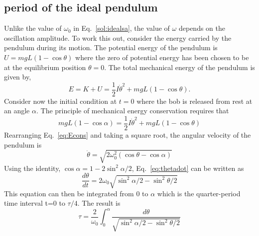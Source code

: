 \documentclass{revtex4}
\begin{document}
\subsection{period of the ideal pendulum}

Unlike the value of $\omega_0$ in Eq.~\ref{sol:idealsa}, the value of
$\omega$ depends on the oscillation amplitude.  To work this out, consider
the energy carried by the pendulum during its motion.
The potential energy of the pendulum is $U=mgL(1-\cos{\theta})$ where the
zero of potential energy has been chosen to be at the equilibrium position
$\theta=0$.  The total mechanical energy of the pendulum is given by,
\begin{equation}
E= K + U = \frac{1}{2}I\dot{\theta}^2 + mgL(1-\cos{\theta}).
\label{eq:Etot}
\end{equation}
Consider now the initial condition at $t=0$ where the bob is
released from rest at an angle $\alpha$. The principle of mechanical
energy conservation requires that
\begin{equation}
mgL(1-\cos{\alpha}) = \frac{1}{2}I\dot{\theta}^2 + mgL(1-\cos{\theta})
\label{eq:Econs}
\end{equation}
Rearranging Eq.~\ref{eq:Econs} and taking a square root, the angular
velocity of the pendulum is
\begin{equation}
\dot{\theta} = \sqrt{2\omega_0^2(\cos{\theta} - \cos{\alpha})}
\label{eq:thetadot}
\end{equation}
Using the identity, $\cos{\alpha}= 1-2\sin^2{\alpha/2}$,
Eq.~\ref{eq:thetadot} can be written as
\begin{equation}
\frac{d\theta}{dt}=2\omega_0\sqrt{\sin^2{\alpha/2}-\sin^2{\theta/2}}
\label{eq:dthetadt}
\end{equation}
This equation can then be integrated from 0 to $\alpha$ which is
the quarter-period time interval t=0 to $\tau/4$.  The result is
\begin{equation}
\tau = \frac{2}{\omega_0}\int_0^{\alpha}{\frac{d\theta}
{\sqrt{\sin^2{\alpha/2}-\sin^2{\theta/2}}}}
\label{eq:tau}
\end{equation}
\end{document}
